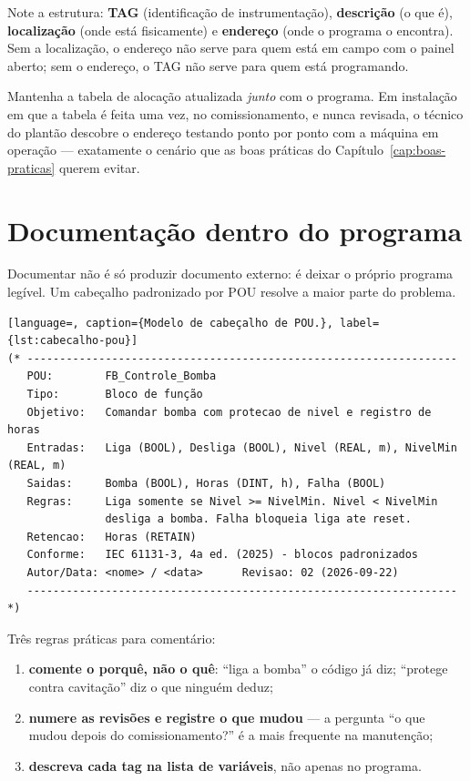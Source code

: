 Note a estrutura: \textbf{TAG} (identificação de instrumentação), \textbf{descrição} (o que é),
\textbf{localização} (onde está fisicamente) e \textbf{endereço} (onde o programa o encontra). Sem a
localização, o endereço não serve para quem está em campo com o painel aberto; sem o endereço, o TAG
não serve para quem está programando.

\begin{atencao}
Mantenha a tabela de alocação atualizada \emph{junto} com o programa. Em instalação em que a tabela é
feita uma vez, no comissionamento, e nunca revisada, o técnico do plantão descobre o endereço
testando ponto por ponto com a máquina em operação --- exatamente o cenário que as boas práticas do
Capítulo~\ref{cap:boas-praticas} querem evitar.
\end{atencao}

\section{Documentação dentro do programa}

Documentar não é só produzir documento externo: é deixar o próprio programa legível. Um cabeçalho
padronizado por POU resolve a maior parte do problema.

\begin{lstlisting}[language=, caption={Modelo de cabeçalho de POU.}, label={lst:cabecalho-pou}]
(* ------------------------------------------------------------------
   POU:        FB_Controle_Bomba
   Tipo:       Bloco de função
   Objetivo:   Comandar bomba com protecao de nivel e registro de horas
   Entradas:   Liga (BOOL), Desliga (BOOL), Nivel (REAL, m), NivelMin (REAL, m)
   Saidas:     Bomba (BOOL), Horas (DINT, h), Falha (BOOL)
   Regras:     Liga somente se Nivel >= NivelMin. Nivel < NivelMin
               desliga a bomba. Falha bloqueia liga ate reset.
   Retencao:   Horas (RETAIN)
   Conforme:   IEC 61131-3, 4a ed. (2025) - blocos padronizados
   Autor/Data: <nome> / <data>      Revisao: 02 (2026-09-22)
   ------------------------------------------------------------------ *)
\end{lstlisting}

Três regras práticas para comentário:

\begin{enumerate}
  \item \textbf{comente o porquê, não o quê}: ``liga a bomba'' o código já diz; ``protege contra
        cavitação'' diz o que ninguém deduz;
  \item \textbf{numere as revisões e registre o que mudou} --- a pergunta ``o que mudou depois do
        comissionamento?'' é a mais frequente na manutenção;
  \item \textbf{descreva cada tag na lista de variáveis}, não apenas no programa.
\end{enumerate}

